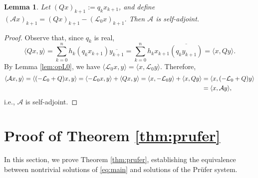 \documentclass[12pt,reqno]{amsart}
\newtheorem{lem}[thm]{Lemma}
\numberwithin{equation}{section}
\begin{document}
\begin{lem}
\label{lem:opA}
Let $(Qx)_{k+1} := q_kx_{k+1}$, and define $(\mathcal{A}x)_{k+1} = (Qx)_{k+1}-(\mathcal{L}_0x)_{k+1}$. Then $\mathcal{A}$ is self-adjoint.
\end{lem}
\begin{proof}
Observe that, since $q_k$ is real,
\[
\langle Qx, y \rangle = \sum_{k=0}^{n} h_k(q_kx_{k+1})\overline{y_{k+1}} = \sum_{k=0}^{n} h_k x_{k+1}\overline{(q_ky_{k+1})}= \langle x, Qy\rangle.
\]
By Lemma \ref{lem:opL0}, we have $\langle \mathcal{L}_0x,y\rangle = \langle x, \mathcal{L}_0y\rangle$. Therefore,
\begin{align*}
        \langle \mathcal{A}x, y\rangle= \langle (-\mathcal{L}_0 + Q)x, y\rangle= \langle -\mathcal{L}_0x, y\rangle + \langle Qx, y \rangle = \langle x, -\mathcal{L}_0y\rangle + \langle x, Qy\rangle &= \langle x, (-\mathcal{L}_0+Q)y\rangle\notag \\
        &=\langle x, \mathcal{A}y\rangle,
    \end{align*}
i.e., $\mathcal{A}$ is self-adjoint.
\end{proof}


\section{Proof of Theorem \ref{thm:prufer}}
\label{sec:Prufer}
In this section, we prove Theorem \ref{thm:prufer}, establishing the equivalence between nontrivial solutions of \eqref{eq:main} and solutions of the Pr\"ufer system.
\end{document}
